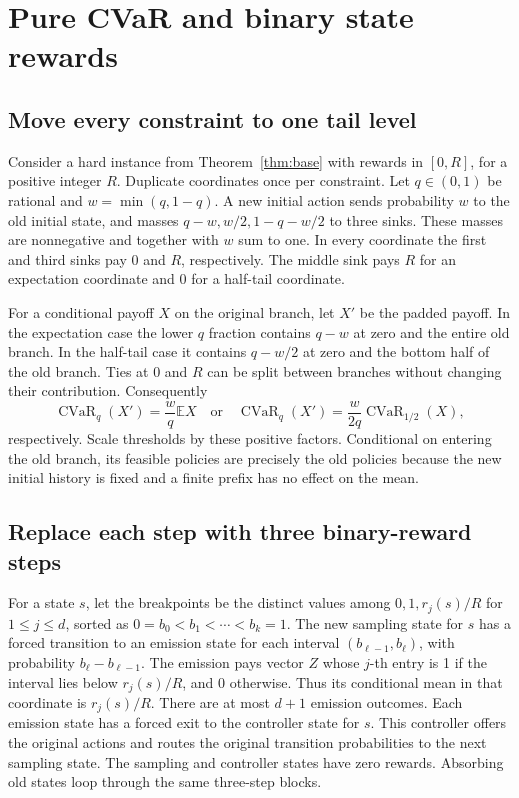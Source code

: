 \documentclass[11pt,a4paper]{amsart}
\newcommand{\CV}{\operatorname{CVaR}}
\begin{document}
\section{Pure CVaR and binary state rewards}\label{sec:binary}

\subsection{Move every constraint to one tail level}
Consider a hard instance from Theorem~\ref{thm:base} with rewards in \([0,R]\), for a positive integer \(R\). Duplicate coordinates once per constraint. Let \(q\in(0,1)\) be rational and \(w=\min(q,1-q)\). A new initial action sends probability \(w\) to the old initial state, and masses \(q-w, w/2, 1-q-w/2\) to three sinks. These masses are nonnegative and together with \(w\) sum to one. In every coordinate the first and third sinks pay 0 and \(R\), respectively. The middle sink pays \(R\) for an expectation coordinate and 0 for a half-tail coordinate.

For a conditional payoff \(X\) on the original branch, let \(X'\) be the padded payoff. In the expectation case the lower \(q\) fraction contains \(q-w\) at zero and the entire old branch. In the half-tail case it contains \(q-w/2\) at zero and the bottom half of the old branch. Ties at 0 and \(R\) can be split between branches without changing their contribution. Consequently
\[
 \CV_q(X')=\frac wq\mathbb E X
 \quad\text{or}\quad
 \CV_q(X')=\frac{w}{2q}\CV_{1/2}(X),
\]
respectively. Scale thresholds by these positive factors. Conditional on entering the old branch, its feasible policies are precisely the old policies because the new initial history is fixed and a finite prefix has no effect on the mean.

\subsection{Replace each step with three binary-reward steps}
For a state \(s\), let the breakpoints be the distinct values among \(0,1,r_j(s)/R\) for \(1\le j\le d\), sorted as \(0=b_0<b_1<\cdots<b_k=1\). The new sampling state for \(s\) has a forced transition to an emission state for each interval \((b_{\ell-1},b_\ell)\), with probability \(b_\ell-b_{\ell-1}\). The emission pays vector \(Z\) whose \(j\)-th entry is 1 if the interval lies below \(r_j(s)/R\), and 0 otherwise. Thus its conditional mean in that coordinate is \(r_j(s)/R\). There are at most \(d+1\) emission outcomes. Each emission state has a forced exit to the controller state for \(s\). This controller offers the original actions and routes the original transition probabilities to the next sampling state. The sampling and controller states have zero rewards. Absorbing old states loop through the same three-step blocks.
\end{document}
